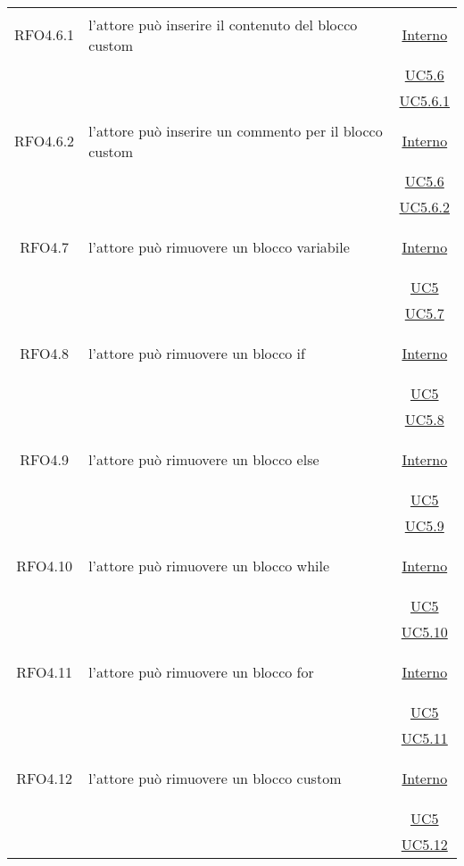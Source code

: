 \begin{longtable}{|c|>{\centering}m{7cm}|c|}
\hypertarget{RFO4.6.1}{RFO4.6.1} & l'attore può inserire il contenuto del blocco custom & \hyperlink{Interno}{Interno}\\
& &\hyperref[UC5.6]{UC5.6}\\
& &\hyperref[UC5.6.1]{UC5.6.1}\\ \hline

\hypertarget{RFO4.6.2}{RFO4.6.2} & l'attore può inserire un commento per il blocco custom & \hyperlink{Interno}{Interno}\\
& &\hyperref[UC5.6]{UC5.6}\\
& &\hyperref[UC5.6.2]{UC5.6.2}\\ \hline

\hypertarget{RFO4.7}{RFO4.7} & l'attore può rimuovere un blocco variabile &\hyperlink{Interno}{Interno}\\
& &\hyperref[UC5]{UC5}\\
& &\hyperref[UC5.7]{UC5.7}\\ \hline

\hypertarget{RFO4.8}{RFO4.8} & l'attore può rimuovere un blocco if & \hyperlink{Interno}{Interno}\\
& &\hyperref[UC5]{UC5}\\
& &\hyperref[UC5.8]{UC5.8}\\ \hline

\hypertarget{RFO4.9}{RFO4.9} & l'attore può rimuovere un blocco else & \hyperlink{Interno}{Interno}\\
& &\hyperref[UC5]{UC5}\\
& &\hyperref[UC5.9]{UC5.9}\\ \hline

\hypertarget{RFO4.10}{RFO4.10} & l'attore può rimuovere un blocco while & \hyperlink{Interno}{Interno}\\
& &\hyperref[UC5]{UC5}\\
& & \hyperref[UC5.10]{UC5.10}\\ \hline

\hypertarget{RFO4.11}{RFO4.11} & l'attore può rimuovere un blocco for & \hyperlink{Interno}{Interno}\\
& &\hyperref[UC5]{UC5}\\
& &\hyperref[UC5.11]{UC5.11}\\ \hline

\hypertarget{RFO4.12}{RFO4.12} & l'attore può rimuovere un blocco custom & \hyperlink{Interno}{Interno}\\
& &\hyperref[UC5]{UC5}\\
& &\hyperref[UC5.12]{UC5.12}\\ \hline


\end{longtable}
